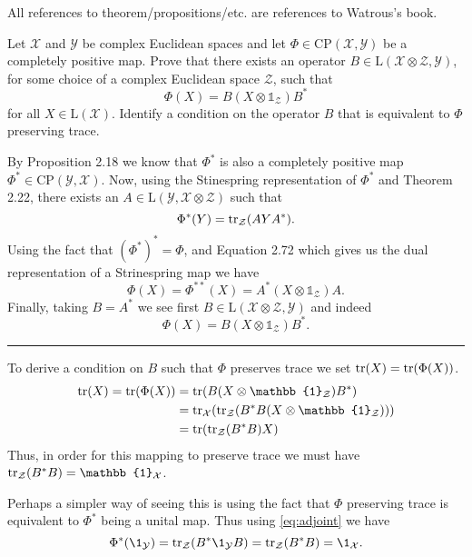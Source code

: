 \documentclass[boxes,pages,color=SeaGreen]{homework}
\newcommand{\I}{\mathbb{1}}
\newcommand{\X}{\mathcal{X}}
\newcommand{\Y}{\mathcal{Y}}
\newcommand{\Z}{\mathcal{Z}}
\newcommand{\Lin}{\mathrm{L}}
\newcommand{\CP}{\mathrm{CP}}
\begin{document}
All references to theorem/propositions/etc. are references to Watrous's book.

\begin{problem}
Let $\X$ and $\Y$ be complex Euclidean spaces and let
$\Phi\in\CP(\X,\Y)$ be a completely positive map.
Prove that there exists an operator $B\in\Lin(\X\otimes\Z,\Y)$, for some
choice of a complex Euclidean space $\Z$, such that
\[
    \Phi(X) = B (X \otimes \I_{\Z}) B^{\ast}
\]
for all $X\in\Lin(\X)$.
Identify a condition on the operator $B$ that is equivalent to $\Phi$
preserving trace.
\end{problem}

\begin{solution}
    By Proposition 2.18 we know that $\Phi^*$ is also a completely positive map $\Phi^*\in\CP(\Y, \X)$.
    Now, using the Stinespring representation of $\Phi^*$ and Theorem 2.22, there exists an $A\in \Lin(\Y, \X\otimes\Z)$ such that
    \begin{equation}\label{eq:adjoint}
        \Phi^*(Y) = \tr_\Z(AYA^*).
    \end{equation}
    Using the fact that $(\Phi^*)^* = \Phi$, and Equation 2.72 which gives us the dual representation of a Strinespring map we have
    \begin{equation*}
        \Phi(X) = \Phi^{**}(X) = A^*(X\otimes\I_\Z)A.
    \end{equation*}
    Finally, taking $B = A^*$ we see first $B\in\Lin(\X\otimes\Z, \Y)$ and indeed
    \begin{equation*}
        \Phi(X) = B (X \otimes \I_{\Z}) B^*.
    \end{equation*}
    {\color{SeaGreen!30}\rule{\textwidth}{1.5pt}}

    \noindent
    To derive a condition on $B$ such that $\Phi$ preserves trace we set $\tr(X) = \tr(\Phi(X))$.
    \begin{align*}
        \tr(X) = \tr(\Phi(X)) & = \tr(B(X\otimes\I_\Z)B^*)            \\
                              & = \tr_\X(\tr_\Z(B^*B(X\otimes\I_\Z))) \\
                              & = \tr(\tr_\Z(B^*B)X)
    \end{align*}
    Thus, in order for this mapping to preserve trace we must have $\tr_\Z(B^*B) = \I_\X$.

    Perhaps a simpler way of seeing this is using the fact that $\Phi$ preserving trace is equivalent to $\Phi^*$ being a unital map.
    Thus using \cref{eq:adjoint} we have
    \begin{equation*}
        \Phi^*(\1_\Y) = \tr_\Z(B^*\1_\Y B) = \tr_\Z(B^* B) = \1_\X.
    \end{equation*}
\end{solution}
\end{document}
